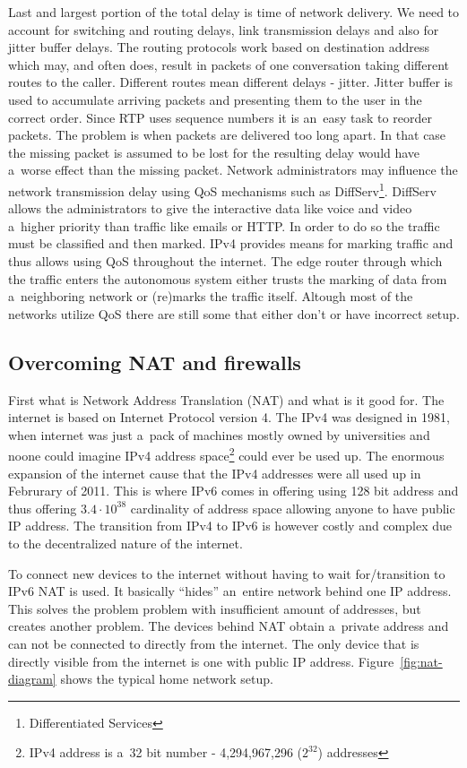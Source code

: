 Last and largest portion of the total delay is time of network delivery. We need to account for switching and routing delays, link transmission delays and also for jitter buffer delays. The routing protocols work based on destination address which may, and often does, result in packets of one conversation taking different routes to the caller. Different routes mean different delays - jitter. Jitter buffer is used to accumulate arriving packets and presenting them to the user in the correct order. Since RTP uses sequence numbers it is an~easy task to reorder packets. The problem is when packets are delivered too long apart. In that case the missing packet is assumed to be lost for the resulting delay would have a~worse effect than the missing packet. Network administrators may influence the network transmission delay using QoS mechanisms such as DiffServ\footnote{Differentiated Services}. DiffServ allows the administrators to give the interactive data like voice and video a~higher priority than traffic like emails or HTTP. In order to do so the traffic must be classified and then marked. IPv4 provides means for marking traffic and thus allows using QoS throughout the internet. The edge router through which the traffic enters the autonomous system either trusts the marking of data from a~neighboring network or (re)marks the traffic itself. Altough most of the networks utilize QoS there are still some that either don't or have incorrect setup.  

\subsection*{Overcoming NAT and firewalls}
First what is Network Address Translation (NAT) and what is it good for. The internet is based on Internet Protocol version 4. The IPv4 was designed in 1981, when internet was just a~pack of machines mostly owned by universities and noone could imagine IPv4 address space\footnote{IPv4 address is a~32 bit number - 4,294,967,296 ($2^{32}$) addresses} could ever be used up. The enormous expansion of the internet cause that the IPv4 addresses were all used up in Februrary of 2011\cite{ianaAddressSpaceReport}. This is where IPv6 comes in offering using 128 bit address and thus offering $3.4\cdot10^{38}$ cardinality of address space allowing anyone to have public IP address. The transition from IPv4 to IPv6 is however costly and complex due to the decentralized nature of the internet.  

To connect new devices to the internet without having to wait for/transition to IPv6 NAT is used. It basically ``hides'' an~entire network behind one IP address. This solves the problem problem with insufficient amount of addresses, but creates another problem. The devices behind NAT obtain a~private address and can not be connected to directly from the internet. The only device that is directly visible from the internet is one with public IP address. Figure~\ref{fig:nat-diagram} shows the typical home network setup. 

